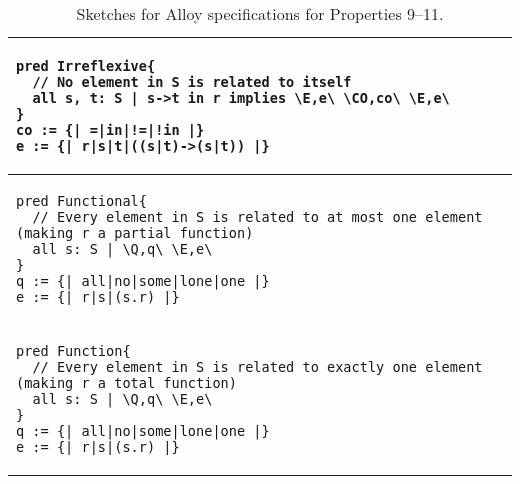 \begin{table}[!t]
\centering
\begin{tabular}{p{12cm}}
\hline

\begin{lstlisting}[style=AlloyTable]
pred Irreflexive{
  // No element in S is related to itself
  all s, t: S | s->t in r implies \E,e\ \CO,co\ \E,e\
}
co := {| =|in|!=|!in |}
e := {| r|s|t|((s|t)->(s|t)) |}
\end{lstlisting} \\ \hline

\begin{lstlisting}[style=AlloyTable]
pred Functional{
  // Every element in S is related to at most one element (making r a partial function)
  all s: S | \Q,q\ \E,e\
}
q := {| all|no|some|lone|one |}
e := {| r|s|(s.r) |}
\end{lstlisting} \\ \hline

\begin{lstlisting}[style=AlloyTable]
pred Function{
  // Every element in S is related to exactly one element (making r a total function)
  all s: S | \Q,q\ \E,e\
}
q := {| all|no|some|lone|one |}
e := {| r|s|(s.r) |}
\end{lstlisting} \\ \hline

\end{tabular}
\vspace*{2ex}
\caption{Sketches for Alloy specifications for Properties 9--11.}
\label{tab:sketches-9-11}
\end{table}
